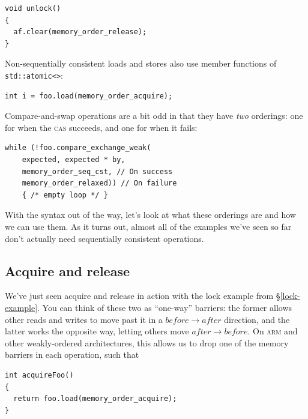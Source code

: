\documentclass[fontsize=10pt, numbers=endperiod]{scrartcl}
\newcommand{\codesize}{\fontsize{10pt}{12pt}}
\newcommand{\secref}[1]{\hyperref[#1]{\textsc{\S}\ref*{#1}}}
\newenvironment{colfigure}
  {\par\vspace{1\baselineskip minus 0.5\baselineskip}\noindent\minipage{\linewidth}}
  {\endminipage\vspace*{1\baselineskip minus 0.7\baselineskip}}
\begin{document}
\begin{multicols*}{2}
\begin{colfigure}
\begin{verbatim}
void unlock()
{
  af.clear(memory_order_release);
}
\end{verbatim}
\end{colfigure}
Non-sequentially consistent loads and stores also use member functions of
\texttt{std::atomic<>}:
\begin{colfigure}
\begin{verbatim}
int i = foo.load(memory_order_acquire);
\end{verbatim}
\end{colfigure}
Compare-and-swap operations are a bit odd in that they have \emph{two}
orderings: one for when the \textsc{cas} succeeds, and one for when it fails:
\begin{colfigure}
\begin{verbatim}
while (!foo.compare_exchange_weak(
    expected, expected * by,
    memory_order_seq_cst, // On success
    memory_order_relaxed)) // On failure
    { /* empty loop */ }
\end{verbatim}
\end{colfigure}

With the syntax out of the way,
let's look at what these orderings are and how we can use them.
As it turns out, almost all of the examples we've seen so far don't actually
need sequentially consistent operations.

\subsection{Acquire and release}

We've just seen acquire and release in action with the
lock example from \secref{lock-example}.
You can think of these two as ``one-way'' barriers:
the former allows other reads and writes to move past it in a $before \to after$
direction, and the latter works the opposite way,
letting others move $after \to before$.
On \textsc{arm} and other weakly-ordered architectures, this allows us to drop
one of the memory barriers in each operation, such that

\begin{colfigure}
\begin{verbatim}
int acquireFoo()
{
  return foo.load(memory_order_acquire);
}


\end{verbatim}
\end{colfigure}
\end{multicols*}
\end{document}
